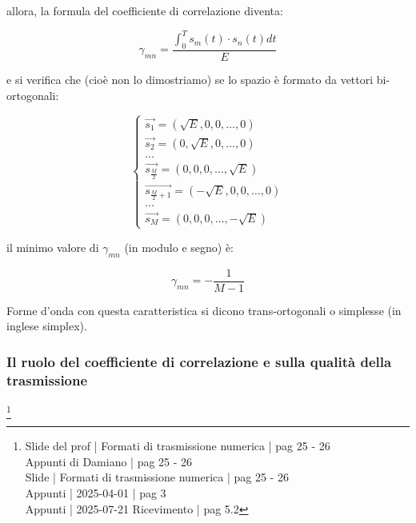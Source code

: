 allora, la formula del coefficiente di correlazione diventa: 

{
    \Large 
    \begin{equation}
     \gamma_{mn}
        =
        \frac
        {
        \int_{0}^{T}
        s_m (t) \cdot s_n (t) dt 
        }{E}   
    \end{equation}
}

e si verifica che (cioè non lo dimostriamo) 
se lo spazio è formato da vettori bi-ortogonali: 

{
    \Large 
    \begin{equation}
        \begin{cases}
        \overrightarrow{s_1} = \left( \sqrt{E}, 0, 0, \dots, 0 \right)  
        \\
        \overrightarrow{s_2} = \left( 0 , \sqrt{E}, 0, \dots, 0 \right)  
        \\
        \dots
        \\
        \overrightarrow{s_{\frac{M}{2}}} = \left( 0 , 0, 0, \dots, \sqrt{E} \right)  
        \\
        \overrightarrow{s_{\frac{M}{2} + 1}} = \left( - \sqrt{E}, 0, 0, \dots, 0 \right)  
        \\
        \dots
        \\
        \overrightarrow{s_{M}} = \left( 0 , 0, 0, \dots, - \sqrt{E} \right)  
    \end{cases}
    \end{equation}
}

il minimo valore di $\gamma_{mn}$ (in modulo e segno) è: 

{
    \Large 
    \begin{equation}
        \gamma_{mn} = - \frac{1}{M - 1}
    \end{equation}
}

Forme d'onda con questa caratteristica si dicono trans-ortogonali o simplesse (in inglese simplex). \newline 

\newpage 

\subsubsection{Il ruolo del coefficiente di correlazione e sulla qualità della trasmissione}
\footnote{Slide del prof | Formati di trasmissione numerica | pag 25 - 26 \\  
Appunti di Damiano | pag 25 - 26\\
Slide | Formati di trasmissione numerica | pag  25 - 26\\
Appunti | 2025-04-01 | pag 3 \\
Appunti | 2025-07-21 Ricevimento | pag 5.2
}

